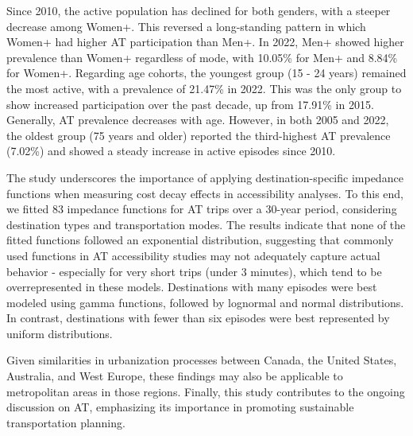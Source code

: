 \documentclass[preprint, 3p,
authoryear]{elsarticle} %
\begin{document}
Since 2010, the active population has declined for both genders, with a
steeper decrease among Women+. This reversed a long-standing pattern in
which Women+ had higher AT participation than Men+. In 2022, Men+ showed
higher prevalence than Women+ regardless of mode, with 10.05\% for Men+
and 8.84\% for Women+. Regarding age cohorts, the youngest group (15 -
24 years) remained the most active, with a prevalence of 21.47\% in
2022. This was the only group to show increased participation over the
past decade, up from 17.91\% in 2015. Generally, AT prevalence decreases
with age. However, in both 2005 and 2022, the oldest group (75 years and
older) reported the third-highest AT prevalence (7.02\%) and showed a
steady increase in active episodes since 2010.

The study underscores the importance of applying destination-specific
impedance functions when measuring cost decay effects in accessibility
analyses. To this end, we fitted 83 impedance functions for AT trips
over a 30-year period, considering destination types and transportation
modes. The results indicate that none of the fitted functions followed
an exponential distribution, suggesting that commonly used functions in
AT accessibility studies may not adequately capture actual behavior -
especially for very short trips (under 3 minutes), which tend to be
overrepresented in these models. Destinations with many episodes were
best modeled using gamma functions, followed by lognormal and normal
distributions. In contrast, destinations with fewer than six episodes
were best represented by uniform distributions.

Given similarities in urbanization processes between Canada, the United
States, Australia, and West Europe, these findings may also be
applicable to metropolitan areas in those regions. Finally, this study
contributes to the ongoing discussion on AT, emphasizing its importance
in promoting sustainable transportation planning.

\renewcommand\refname{References}

\end{document}
